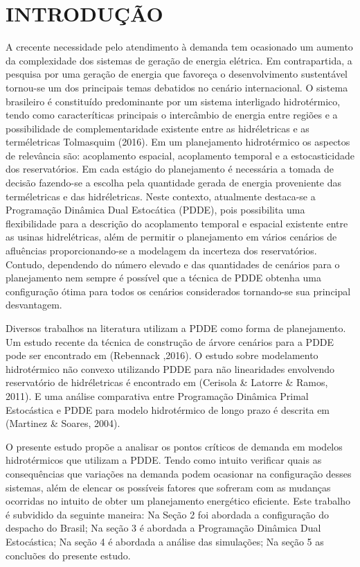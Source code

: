 \documentclass[12pt,fleqn]{article}
\begin{document}
\section{INTRODU\c C\~AO}
A crecente necessidade pelo atendimento \`a demanda tem ocasionado um aumento da complexidade dos
sistemas de gera\c c\~ao de energia el\'etrica. Em contrapartida, a pesquisa por uma gera\c c\~ao de energia que favore\c
ca o desenvolvimento sustent\'avel tornou-se um dos principais temas debatidos no cen\'ario internacional. O sistema brasileiro \'e constitu\'ido predominante por um sistema interligado
hidrot\'ermico, tendo como caracter\'iticas principais o interc\^ambio de energia entre regi\~oes e a possibilidade de
complementaridade existente entre as hidr\'eletricas e as term\'eletricas Tolmasquim (2016). Em um planejamento hidrot\'ermico os aspectos
de relev\^ancia s\~ao: acoplamento espacial, acoplamento temporal e a estocasticidade dos reservat\'orios. Em cada
est\'agio do planejamento \'e necess\'aria a tomada de decis\~ao fazendo-se a escolha pela quantidade gerada de energia
proveniente das term\'eletricas e das hidr\'eletricas. Neste
contexto, atualmente destaca-se a Programa\c c\~ao Din\^amica Dual
Estoc\'atica (PDDE), pois possibilita uma flexibilidade para a descri\c c\~ao do acoplamento temporal e espacial existente entre as
usinas hidrel\'etricas, al\'em de permitir o  planejamento em v\'arios cen\'arios de aflu\^encias proporcionando-se a
modelagem da incerteza dos reservat\'orios. Contudo, dependendo do n\'umero elevado e das quantidades de cen\'arios  para o planejamento
nem sempre \'e poss\'ivel que a t\'ecnica de PDDE obtenha uma configura\c c\~ao \'otima para todos os cen\'arios
considerados tornando-se sua principal desvantagem.

Diversos trabalhos na literatura utilizam a PDDE como forma de planejamento. Um estudo recente da t\'ecnica
de constru\c c\~ao de \'arvore cen\'arios para a PDDE pode ser encontrado em (Rebennack
,2016). O estudo sobre modelamento hidrot\'ermico n\~ao convexo utilizando PDDE para n\~ao linearidades envolvendo reservat\'orio de
hidr\'eletricas \'e encontrado em (Cerisola \& Latorre \& Ramos,
2011). E uma an\'alise comparativa entre Programa\c c\~ao Din\^amica Primal Estoc\'astica e PDDE para modelo
hidrot\'ermico de longo prazo \'e descrita em (Martinez \&
Soares, 2004). 

O presente estudo propõe a analisar os pontos cr\'iticos de demanda em modelos hidrot\'ermicos que utilizam a PDDE.
Tendo como intuito verificar quais as consequ\^encias que varia\c c\~oes na demanda podem ocasionar na configura\c c\~ao
desses sistemas, al\'em de elencar os poss\'iveis fatores que sofreram com as mudan\c cas ocorridas no intuito de obter
um planejamento energ\'etico eficiente. Este trabalho \'e
subvidido da seguinte maneira: Na Se\c c\~ao 2 foi abordada a configura\c c\~ao do despacho do Brasil; Na se\c c\~ao 3
\'e abordada a Programa\c c\~ao Din\^amica Dual Estoc\'astica; Na se\c c\~ao 4 \'e abordada a an\'alise das simula\c
c\~oes; Na se\c c\~ao 5 as conclu\~oes do presente estudo. 
\end{document}
